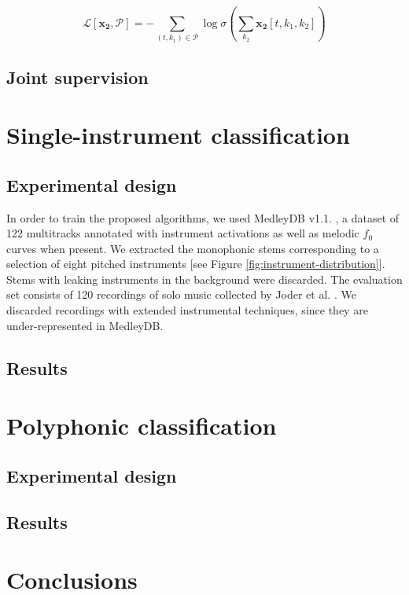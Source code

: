 \documentclass{article}
\begin{document}
\begin{equation}
\mathscr{L}[\boldsymbol{x_2}, \mathcal{P}] =
- \sum_{(t, k_1)\in\mathcal{P}} 
\log \sigma
\left( \sum_{k_2} \boldsymbol{x_2}[t,k_1,k_2] \right)
\end{equation}

\subsection{Joint supervision}


\section{Single-instrument classification}\label{sec:single-instrument}
\subsection{Experimental design}
In order to train the proposed algorithms, we used MedleyDB v1.1. \cite{Bittner2014}, a dataset of 122 multitracks annotated with instrument activations as well as melodic $f_0$ curves when present. We extracted the monophonic stems corresponding to a selection of eight pitched instruments [see Figure \ref{fig:instrument-distribution}]. Stems with leaking instruments in the background were discarded.
The evaluation set consists of 120 recordings of solo music collected by Joder et al. \cite{Joder2009}. We discarded recordings with extended instrumental techniques, since they are under-represented in MedleyDB.

\subsection{Results}


\section{Polyphonic classification}\label{sec:polyphonic}
\subsection{Experimental design}

\subsection{Results}


\section{Conclusions}


\end{document}
